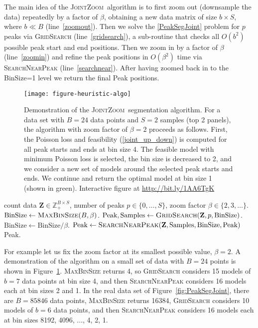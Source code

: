\documentclass{article} %
\newcommand{\ZZ}{\mathbb Z}
\newcommand{\JointHeuristic}{\textsc{JointZoom}}
\begin{document}
The main idea of the \JointHeuristic\ algorithm is to first zoom out
(downsample the data) repeatedly by a factor of $\beta$, obtaining a
new data matrix of size $b\times S$, where $b \ll B$
(line~\ref{zoomout}). Then we solve the \ref{PeakSegJoint} problem for
$p$ peaks via \textsc{GridSearch} (line~\ref{gridsearch}), a
sub-routine that checks all $O(b^2)$ possible peak start and end
positions. Then we zoom in by a factor of $\beta$ (line~\ref{zoomin})
and refine the peak positions in $O(\beta^2)$ time via
\textsc{SearchNearPeak} (line~\ref{searchnear}). After having zoomed
back in to the BinSize=1 level we return the final Peak
positions. 

\begin{figure}[b!]
  \centering
  \texttt{[image: figure-heuristic-algo]}
  \vskip -0.5cm
  \caption{Demonstration of the \JointHeuristic\ segmentation
    algorithm. For a data set with $B=24$ data points and $S=2$
    samples (top 2 panels), the algorithm with zoom factor of
    $\beta=2$ proceeds as follows. First, the Poisson loss and
    feasibility (\ref{joint_up_down}) is computed for all 
    peak starts and ends at bin size 4. The feasible model with
    minimum Poisson loss is selected, the bin size is decreased to 2,
    and we consider a new set of models around the selected peak
    starts and ends. We continue and return the optimal model at bin
    size 1 (shown in green). Interactive figure at
    \url{http://bit.ly/1AA6TgK}}
  \label{fig:heuristic-algo}
\end{figure}

\begin{algorithm}[H]
\begin{algorithmic}[1]
  \REQUIRE count data $\mathbf Z\in\ZZ_+^{B\times S}$, number of
  peaks $p\in\{0, \dots, S\}$, zoom factor
  $\beta\in\{2, 3, \dots\}$.
  \STATE $\textrm{BinSize} \gets \textsc{MaxBinSize}(B, \beta)$. \label{zoomout}
  \STATE $\textrm{Peak}, \textrm{Samples} \gets \label{gridsearch}
  \textsc{GridSearch}(\mathbf Z, p, \textrm{BinSize})$.
  \STATE $\textrm{BinSize} \gets \textrm{BinSize} / \beta$. \label{zoomin}
  \STATE $\textrm{Peak} \gets
  \textsc{SearchNearPeak}(\mathbf Z, \textrm{Samples}, \label{searchnear}
  \textrm{BinSize}, \textrm{Peak})$
  \ENDWHILE
  \RETURN Peak.
\caption{\JointHeuristic}
\end{algorithmic}\label{algo}
\end{algorithm}

For example let us fix the zoom factor at its smallest possible value,
$\beta=2$. A demonstration of the algorithm on a small set of data
with $B=24$ points is shown in
Figure~\ref{fig:heuristic-algo}. \textsc{MaxBinSize} returns 4, so
\textsc{GridSearch} considers 15 models of $b=7$ data points at bin
size 4, and then \textsc{SearchNearPeak} considers 16 models each at
bin sizes 2 and 1. In the real data set of
Figure~\ref{fig:PeakSegJoint}, there are $B=85846$ data points,
\textsc{MaxBinSize} returns 16384, \textsc{GridSearch} considers 10
models of $b=6$ data points, and then \textsc{SearchNearPeak}
considers 16 models each at bin sizes 8192, 4096, ..., 4, 2, 1.
\end{document}
